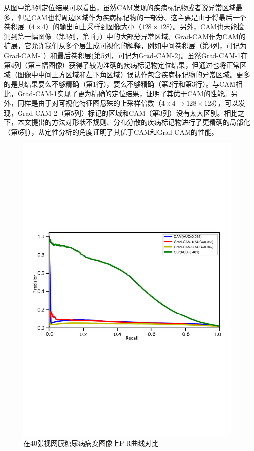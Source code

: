 从图中第$3$列定位结果可以看出，虽然CAM发现的疾病标记物或者说异常区域最多，但是CAM也将周边区域作为疾病标记物的一部分。这主要是由于将最后一个卷积层（$4\times 4$）的输出向上采样到图像大小（$128\times 128$）。另外，CAM也未能检测到第一幅图像（第$3$列，第$1$行）中的大部分异常区域。Grad-CAM作为CAM的扩展，它允许我们从多个层生成可视化的解释，例如中间卷积层（第$4$列，可记为Grad-CAM-1）和最后卷积层(第$5$列，可记为Grad-CAM-2)。虽然Grad-CAM-1在第$4$列（第三幅图像）获得了较为准确的疾病标记物定位结果，但通过也将正常区域（图像中中间上方区域和左下角区域）误认作包含疾病标记物的异常区域。更多的是其结果要么不够精确（第$1$行），要么不够精确（第$2$行和第$3$行）。与CAM相比，Grad-CAM-1实现了更为精确的定位结果，证明了其优于CAM的性能。另外，同样是由于对可视化特征图悬殊的上采样倍数（$4\times 4 \rightarrow 128\times 128$），可以发现，Grad-CAM-2（第$5$列）标记的区域和CAM（第$3$列）没有太大区别。相比之下，本文提出的方法对形状不规则、分布分散的疾病标记物进行了更精确的局部化（第$6$列），从定性分析的角度证明了其优于CAM和Grad-CAM的性能。
\begin{figure}[h!]
	\centering
	\includegraphics[width=1.0\textwidth]{figure/pr_curve_retinal_image/pr_curve}
	\caption{在$40$张视网膜糖尿病病变图像上P-R曲线对比}
	\label{fig:retinal_image_pr_curve}
\end{figure}

